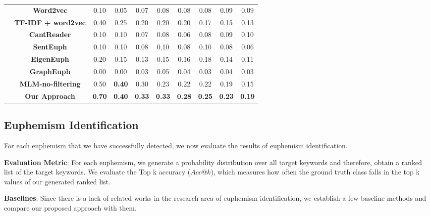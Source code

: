\begin{table*}[ht!]
\begin{tabular}{c|c|cccccccc}
		\multirow{8}{*}{\rotatebox[origin=c]{90}{\textbf{Sexuality}}}
		&\textbf{Word2vec} & 0.10 & 0.05 & 0.07 & 0.08 & 0.08 & 0.08 & 0.09 &  0.09 \\
		&\textbf{TF-IDF + word2vec} & 0.40 & 0.25 & 0.20 & 0.20 & 0.20 & 0.17 & 0.15 & 0.13  \\
		&\textbf{CantReader \cite{yuan2018reading}} & 0.10 & 0.10 & 0.07 & 0.08 & 0.06 & 0.08 & 0.09 & 0.10 \\
		&\textbf{SentEuph \cite{felt2020recognizing}} & 0.10 & 0.10 & 0.08 & 0.10 & 0.08 & 0.10 & 0.08 & 0.06\\
		&\textbf{EigenEuph \cite{magu2018determining}} & 0.20 & 0.15 & 0.13 & 0.15 & 0.16 & 0.18 & 0.14 & 0.11\\
		&\textbf{GraphEuph \cite{taylor2017surfacing}} & 0.00 & 0.00 & 0.03 & 0.05 & 0.04 & 0.03 & 0.04 & 0.03 \\
		&\textbf{MLM-no-filtering} & 0.50 & \textbf{0.40} & 0.30 & 0.23 & 0.22 & 0.22 & 0.19 & 0.15 \\
		&\textbf{Our Approach} & \textbf{0.70} & \textbf{0.40}& \textbf{0.33}& \textbf{0.33}& \textbf{0.28}& \textbf{0.25}& \textbf{0.23}& \textbf{0.19} \\
		\bottomrule
	\end{tabular}
	\label{table:res_dec}
\end{table*}



\subsection{Euphemism Identification}
\label{sec:res_iden}
For each euphemism that we have successfully detected, we now evaluate the results of euphemism identification. 

\noindent \textbf{Evaluation Metric}: 
For each euphemism, we generate a probability distribution over all target keywords and therefore, obtain a ranked list of the target keywords. 
We evaluate the Top k accuracy ($Acc@k$), which measures how often the ground truth class falls in the top k values of our generated ranked list. 


\noindent \textbf{Baselines}: 
Since there is a lack of related works in the research area of euphemism identification, we establish a few baseline methods and compare our proposed approach with them. 

